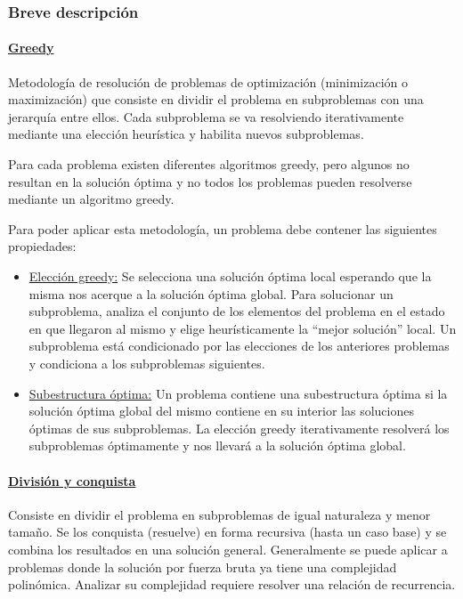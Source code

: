 \documentclass[../tp2_grupo404.tex]{subfiles}
\begin{document}
\subsubsection{Breve descripción}

\paragraph{\underline{Greedy}}

Metodología de resolución de problemas de optimización
(minimización o maximización) que consiste en dividir el problema en
subproblemas con una jerarquía entre ellos. Cada subproblema se va
resolviendo iterativamente mediante una elección heurística y habilita
nuevos subproblemas.
\par Para cada problema existen diferentes algoritmos greedy, pero
algunos no resultan en la solución óptima y no todos los problemas
pueden resolverse mediante un algoritmo greedy.
\par Para poder aplicar esta metodología, un problema debe contener
las siguientes propiedades:
\begin{itemize}
    \item \underline{Elección greedy:} Se selecciona una solución óptima local
    esperando que la misma nos acerque a la solución óptima global.
    Para solucionar un subproblema, analiza el conjunto de los elementos
    del problema en el estado en que llegaron al mismo y elige
    heurísticamente la “mejor solución” local. Un subproblema está
    condicionado por las elecciones de los anteriores problemas y
    condiciona a los subproblemas siguientes.

    \item \underline{Subestructura óptima:} Un problema contiene una subestructura
    óptima si la solución óptima global del mismo contiene en su
    interior las soluciones óptimas de sus subproblemas. La elección
    greedy iterativamente resolverá los subproblemas óptimamente y nos
    llevará a la solución óptima global.

\end{itemize}

\paragraph{\underline{División y conquista}}
Consiste en dividir el problema en
subproblemas de igual naturaleza y menor tamaño. Se los conquista
(resuelve) en forma recursiva (hasta un caso base) y se combina los
resultados en una solución general. Generalmente se puede aplicar a
problemas donde la solución por fuerza bruta ya tiene una complejidad
polinómica. Analizar su complejidad requiere resolver una relación de
recurrencia.
\end{document}
